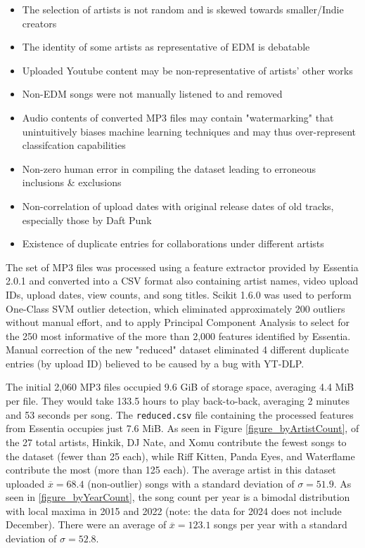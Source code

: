 \documentclass[article,pdftex,12pt,a4paper]{article}
\def\code#1{\texttt{#1}}
\begin{document}
\begin{itemize}
  \item The selection of artists is not random and is skewed towards smaller/Indie creators
  \item The identity of some artists as representative of EDM is debatable
  \item Uploaded Youtube content may be non-representative of artists' other works
  \item Non-EDM songs were not manually listened to and removed
  \item Audio contents of converted MP3 files may contain "watermarking" that unintuitively biases machine learning techniques and may thus over-represent classifcation capabilities
  \item Non-zero human error in compiling the dataset leading to erroneous inclusions \& exclusions
  \item Non-correlation of upload dates with original release dates of old tracks, especially those by Daft Punk
  \item Existence of duplicate entries for collaborations under different artists
\end{itemize}
The set of MP3 files was processed using a feature extractor provided by Essentia 2.0.1 and converted into a CSV format also containing artist names, video upload IDs, upload dates, view counts, and song titles. Scikit 1.6.0 was used to perform One-Class SVM outlier detection, which eliminated approximately 200 outliers without manual effort, and to apply Principal Component Analysis to select for the 250 most informative of the more than 2,000 features identified by Essentia. Manual correction of the new "reduced" dataset eliminated 4 different duplicate entries (by upload ID) believed to be caused by a bug with YT-DLP.

The initial 2,060 MP3 files occupied 9.6 GiB of storage space, averaging 4.4 MiB per file. They would take 133.5 hours to play back-to-back, averaging 2 minutes and 53 seconds per song. The \code{reduced.csv} file containing the processed features from Essentia occupies just 7.6 MiB. As seen in Figure \ref{figure_byArtistCount}, of the 27 total artists, Hinkik, DJ Nate, and Xomu contribute the fewest songs to the dataset (fewer than 25 each), while Riff Kitten, Panda Eyes, and Waterflame contribute the most (more than 125 each). The average artist in this dataset uploaded $\overline{x} = 68.4$ (non-outlier) songs with a standard deviation of $\sigma = 51.9$. As seen in \ref{figure_byYearCount}, the song count per year is a bimodal distribution with local maxima in 2015 and 2022 (note: the data for 2024 does not include December). There were an average of $\overline{x} = 123.1$ songs per year with a standard deviation of $\sigma = 52.8$.
\end{document}
